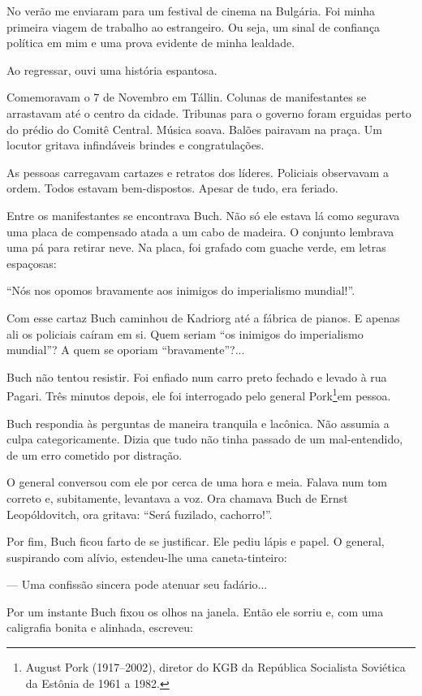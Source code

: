 No verão me enviaram para um festival de cinema na Bulgária. Foi minha
primeira viagem de trabalho ao estrangeiro. Ou seja, um sinal de
confiança política em mim e uma prova evidente de minha lealdade.

Ao regressar, ouvi uma história espantosa.

Comemoravam o 7 de Novembro em Tállin. Colunas de manifestantes se
arrastavam até o centro da cidade. Tribunas para o governo foram
erguidas perto do prédio do Comitê Central. Música soava. Balões
pairavam na praça. Um locutor gritava infindáveis brindes e
congratulações.

As pessoas carregavam cartazes e retratos dos líderes. Policiais
observavam a ordem. Todos estavam bem-dispostos. Apesar de tudo, era
feriado.

Entre os manifestantes se encontrava Buch. Não só ele estava lá como
segurava uma placa de compensado atada a um cabo de madeira. O conjunto
lembrava uma pá para retirar neve. Na placa, foi grafado com guache
verde, em letras espaçosas:

``Nós nos opomos bravamente aos inimigos do imperialismo mundial!''.

Com esse cartaz Buch caminhou de Kadriorg até a fábrica de pianos. E
apenas ali os policiais caíram em si. Quem seriam ``os inimigos do
imperialismo mundial''? A quem se oporiam ``bravamente''?...

Buch não tentou resistir. Foi enfiado num carro preto fechado e levado à
rua Pagari. Três minutos depois, ele foi interrogado pelo general
Pork\footnote{August Pork (1917--2002), diretor do KGB da República
  Socialista Soviética da Estônia de 1961 a 1982.}em pessoa.

Buch respondia às perguntas de maneira tranquila e lacônica. Não assumia
a culpa categoricamente. Dizia que tudo não tinha passado de um
mal-entendido, de um erro cometido por distração.

O general conversou com ele por cerca de uma hora e meia. Falava num tom
correto e, subitamente, levantava a voz. Ora chamava Buch de Ernst
Leopóldovitch, ora gritava: ``Será fuzilado, cachorro!''.

Por fim, Buch ficou farto de se justificar. Ele pediu lápis e papel. O
general, suspirando com alívio, estendeu-lhe uma caneta-tinteiro:

--- Uma confissão sincera pode atenuar seu fadário...

Por um instante Buch fixou os olhos na janela. Então ele sorriu e, com
uma caligrafia bonita e alinhada, escreveu:

